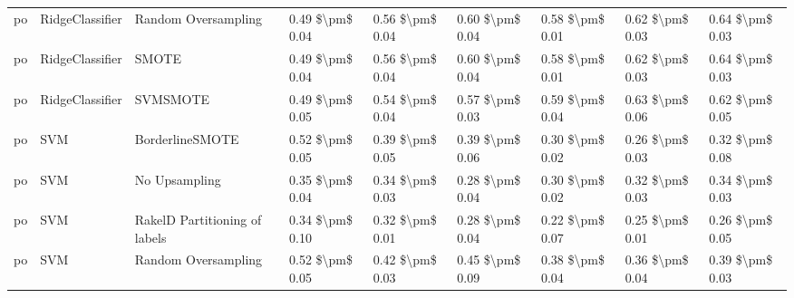 \begin{tabular}{lllllllll}
      po &                 RidgeClassifier &           Random Oversampling & 0.49 \$\textbackslash pm\$ 0.04 &           0.56 \$\textbackslash pm\$ 0.04 &       0.60 \$\textbackslash pm\$ 0.04 &        0.58 \$\textbackslash pm\$ 0.01 &                         0.62 \$\textbackslash pm\$ 0.03 &     0.64 \$\textbackslash pm\$ 0.03 \\
      po &                 RidgeClassifier &                         SMOTE & 0.49 \$\textbackslash pm\$ 0.04 &           0.56 \$\textbackslash pm\$ 0.04 &       0.60 \$\textbackslash pm\$ 0.04 &        0.58 \$\textbackslash pm\$ 0.01 &                         0.62 \$\textbackslash pm\$ 0.03 &     0.64 \$\textbackslash pm\$ 0.03 \\
      po &                 RidgeClassifier &                      SVMSMOTE & 0.49 \$\textbackslash pm\$ 0.05 &           0.54 \$\textbackslash pm\$ 0.04 &       0.57 \$\textbackslash pm\$ 0.03 &        0.59 \$\textbackslash pm\$ 0.04 &                         0.63 \$\textbackslash pm\$ 0.06 &     0.62 \$\textbackslash pm\$ 0.05 \\
      po &                             SVM &               BorderlineSMOTE & 0.52 \$\textbackslash pm\$ 0.05 &           0.39 \$\textbackslash pm\$ 0.05 &       0.39 \$\textbackslash pm\$ 0.06 &        0.30 \$\textbackslash pm\$ 0.02 &                         0.26 \$\textbackslash pm\$ 0.03 &     0.32 \$\textbackslash pm\$ 0.08 \\
      po &                             SVM &                 No Upsampling & 0.35 \$\textbackslash pm\$ 0.04 &           0.34 \$\textbackslash pm\$ 0.03 &       0.28 \$\textbackslash pm\$ 0.04 &        0.30 \$\textbackslash pm\$ 0.02 &                         0.32 \$\textbackslash pm\$ 0.03 &     0.34 \$\textbackslash pm\$ 0.03 \\
      po &                             SVM & RakelD Partitioning of labels & 0.34 \$\textbackslash pm\$ 0.10 &           0.32 \$\textbackslash pm\$ 0.01 &       0.28 \$\textbackslash pm\$ 0.04 &        0.22 \$\textbackslash pm\$ 0.07 &                         0.25 \$\textbackslash pm\$ 0.01 &     0.26 \$\textbackslash pm\$ 0.05 \\
      po &                             SVM &           Random Oversampling & 0.52 \$\textbackslash pm\$ 0.05 &           0.42 \$\textbackslash pm\$ 0.03 &       0.45 \$\textbackslash pm\$ 0.09 &        0.38 \$\textbackslash pm\$ 0.04 &                         0.36 \$\textbackslash pm\$ 0.04 &     0.39 \$\textbackslash pm\$ 0.03 \\

\end{tabular}
